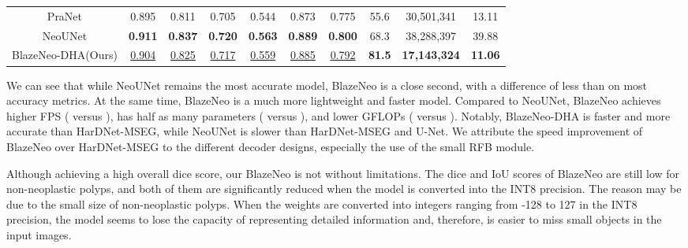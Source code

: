 \documentclass{ieeeaccess}
\newcommand{\ModelName}{BlazeNeo\xspace}
\newcommand{\DHA}{BlazeNeo-DHA\xspace}
\begin{document}
\begin{table*}[ht!]
\begin{tabular}{@{} c | c c c c c c | c c c@{}}
        PraNet \cite{fan2020pranet}          & 0.895                                   & 0.811                                  & 0.705                                   & 0.544                                  & 0.873                                   & 0.775                                     & 55.6                    & 30,501,341                     & 13.11                      \\
        NeoUNet \cite{lan2021neounet}        & \textbf{0.911}                          & \textbf{0.837}                         & \textbf{0.720}                          & \textbf{0.563}                         & \textbf{0.889}                          & \textbf{0.800}                            & 68.3                    & 38,288,397                     & 39.88                      \\
        \DHA (Ours)                          & \underline{0.904}                       & \underline{0.825}                      & \underline{0.717}                       & \underline{0.559}                      & \underline{0.885}                       & \underline{0.792}                         & \textbf{81.5}           & \textbf{17,143,324}            & \textbf{11.06}             \\
        
        \bottomrule
    \end{tabular}
\end{table*}

We can see that while NeoUNet remains the most accurate model, \ModelName is a close second, with a difference of less than  on most accuracy metrics. At the same time, \ModelName is a much more lightweight and faster model. Compared to NeoUNet, \ModelName achieves higher FPS ( versus ), has half as many parameters ( versus ), and lower GFLOPs ( versus ). Notably, \DHA is faster and more accurate than HarDNet-MSEG, while NeoUNet is slower than HarDNet-MSEG and U-Net. We attribute the speed improvement of \ModelName over HarDNet-MSEG to the different decoder designs, especially the use of the small RFB module.

Although achieving a high overall dice score, our \ModelName is not without limitations. The dice and IoU scores of \ModelName are still low for non-neoplastic polyps, and both of them are significantly reduced when the model is converted into the INT8 precision. The reason may be due to the small size of non-neoplastic polyps. When the weights are converted into integers ranging from -128 to 127 in the INT8 precision, the model seems to lose the capacity of representing detailed information and, therefore, is easier to miss small objects in the input images. 
\end{document}
